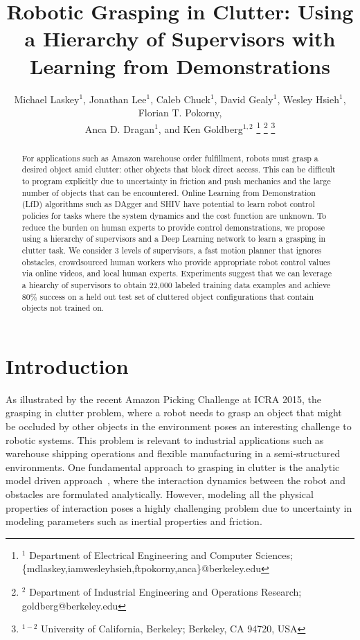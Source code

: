 \documentclass[10pt, conference]{ieeeconf}      %
\title{Robotic Grasping in Clutter: Using a Hierarchy of Supervisors with Learning from Demonstrations}
\author{Michael Laskey$^1$, Jonathan Lee$^1$, Caleb Chuck$^1$, David Gealy$^1$, Wesley Hsieh$^1$, Florian T. Pokorny,\\
 Anca D. Dragan$^1$, and Ken Goldberg$^{1,2}$%
\thanks{$^1$ Department of Electrical Engineering and Computer Sciences; {\small \{mdlaskey,iamwesleyhsieh,ftpokorny,anca\}@berkeley.edu} }%
\thanks{$^2$ Department of Industrial Engineering and Operations Research; {\small goldberg@berkeley.edu}}%
\thanks{$^{1-2}$ University of California, Berkeley;  Berkeley, CA 94720, USA}%
}
\begin{document}
\maketitle
\thispagestyle{empty}
\pagestyle{empty}



\begin{abstract}
For applications such as Amazon warehouse order fulfillment, robots must grasp a desired object amid clutter: other
objects that block direct access.  This can be difficult to program explicitly due to uncertainty in friction and push
mechanics and the large number of objects that can be encountered. Online Learning from Demonstration (LfD) algorithms
such as DAgger and SHIV have potential to learn robot control policies for tasks where the system dynamics and the cost
function are unknown. To reduce the burden on human experts to provide control demonstrations, we propose using a
hierarchy of supervisors and a Deep Learning network to learn a grasping in clutter task.  We consider 3 levels of
supervisors, a fast motion planner that ignores obstacles, crowdsourced human workers who
provide appropriate robot control values via online videos, and local human experts.  Experiments suggest that we can
leverage a hiearchy of supervisors to obtain 22,000 labeled training data examples and achieve 80\% success on a held out test set of cluttered object configurations that contain objects not trained on. 

 \end{abstract}



\section{Introduction} 
As illustrated by the recent Amazon Picking Challenge at ICRA 2015, the grasping in clutter problem, where a robot needs
to grasp an object that might be occluded by other objects in the environment poses an interesting challenge to robotic
systems. This problem is relevant to industrial applications such as warehouse shipping operations and flexible manufacturing in a semi-structured environments. One fundamental approach to grasping in clutter is the analytic model driven approach~\cite{bicchi2000robotic},
where the interaction dynamics between the robot and obstacles are formulated analytically. However, modeling all the 
physical properties of interaction poses a highly challenging problem due to uncertainty in modeling parameters such as
inertial properties and friction. 
\end{document}
